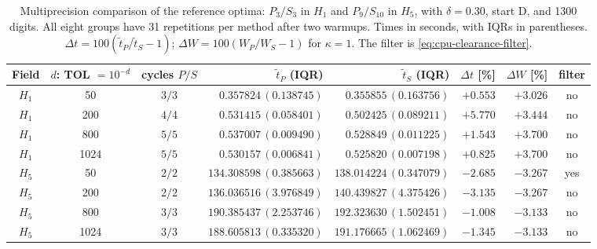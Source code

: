 \begin{table}[htbp]\centering\scriptsize\setlength{\tabcolsep}{3pt}
\caption{Multiprecision comparison of the reference optima: $P_3/S_3$ in $H_1$ and $P_9/S_{10}$ in $H_5$, with $\delta=0.30$, start D, and 1300 digits. All eight groups have 31 repetitions per method after two warmups. Times in seconds, with IQRs in parentheses. $\Delta t=100(\widetilde t_P/\widetilde t_S-1)$; $\Delta W=100(W_P/W_S-1)$ for $\kappa=1$. The filter is \eqref{eq:cpu-clearance-filter}.}\label{tab:mp-family-timings}
\begin{tabular}{cccrrrrc}\toprule
Field & $d$: TOL $=10^{-d}$ & cycles $P/S$ & $\widetilde t_P$ (IQR) & $\widetilde t_S$ (IQR) & $\Delta t$ [\%] & $\Delta W$ [\%] & filter\\\midrule
$H_{1}$ & 50 & $3/3$ & $0.357824\,(0.138745)$ & $0.355855\,(0.163756)$ & $+0.553$ & $+3.026$ & no\\
$H_{1}$ & 200 & $4/4$ & $0.531415\,(0.058401)$ & $0.502425\,(0.089211)$ & $+5.770$ & $+3.444$ & no\\
$H_{1}$ & 800 & $5/5$ & $0.537007\,(0.009490)$ & $0.528849\,(0.011225)$ & $+1.543$ & $+3.700$ & no\\
$H_{1}$ & 1024 & $5/5$ & $0.530157\,(0.006841)$ & $0.525820\,(0.007198)$ & $+0.825$ & $+3.700$ & no\\
\midrule
$H_{5}$ & 50 & $2/2$ & $134.308598\,(0.385663)$ & $138.014224\,(0.347079)$ & $-2.685$ & $-3.267$ & yes\\
$H_{5}$ & 200 & $2/2$ & $136.036516\,(3.976849)$ & $140.439827\,(4.375426)$ & $-3.135$ & $-3.267$ & no\\
$H_{5}$ & 800 & $3/3$ & $190.385437\,(2.253746)$ & $192.323630\,(1.502451)$ & $-1.008$ & $-3.133$ & no\\
$H_{5}$ & 1024 & $3/3$ & $188.605813\,(0.335320)$ & $191.176665\,(1.062469)$ & $-1.345$ & $-3.133$ & no\\
\bottomrule\end{tabular}\end{table}
